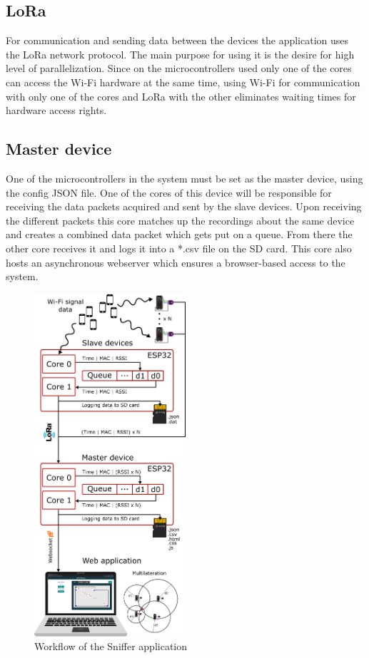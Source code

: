 \documentclass[11pt,a4paper]{article}
\numberwithin{equation}{section}   %
\numberwithin{figure}{section}     %
\numberwithin{table}{section}      %
\begin{document}
\subsection{LoRa}
For communication and sending data between the devices the application uses the LoRa network protocol. The main purpose for using it is the desire for high level of parallelization. Since on the microcontrollers used only one of the cores can access the Wi-Fi hardware at the same time, using Wi-Fi for communication with only one of the cores and LoRa with the other eliminates waiting times for hardware access rights.

\subsection{Master device}
One of the microcontrollers in the system must be set as the master device, using the config JSON file. One of the cores of this device will be responsible for receiving the data packets acquired and sent by the slave devices. Upon receiving the different packets this core matches up the recordings about the same device and creates a combined data packet which gets put on a queue. From there the other core receives it and logs it into a *.csv file on the SD card. This core also hosts an asynchronous webserver which ensures a browser-based access to the system.\\[1cm]

\begin{figure}[H]
    \centering
    \includegraphics[width = 0.5\textwidth]{figures/posterIllustration.png}
    \caption{Workflow of the Sniffer application}
    \label{fig:workflow}
\end{figure}
\end{document}
